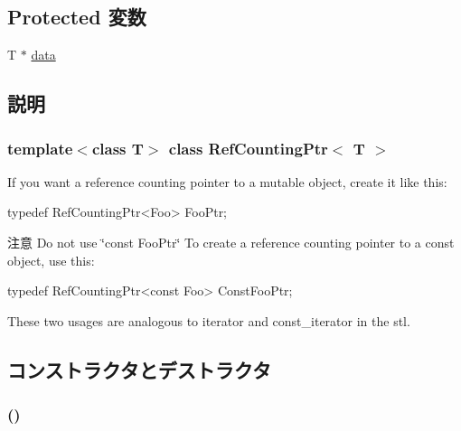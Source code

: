 \subsection*{Protected 変数}
\begin{DoxyCompactItemize}
\item 
T $\ast$ \hyperlink{classRefCountingPtr_ac88dceffbecaed1137b0e27783adbcc5}{data}
\end{DoxyCompactItemize}


\subsection{説明}
\subsubsection*{template$<$class T$>$ class RefCountingPtr$<$ T $>$}

If you want a reference counting pointer to a mutable object, create it like this: 
\begin{DoxyCode}
 typedef RefCountingPtr<Foo> FooPtr;
\end{DoxyCode}


\begin{DoxyAttention}{注意}
Do not use \char`\"{}const FooPtr\char`\"{} To create a reference counting pointer to a const object, use this: 
\begin{DoxyCode}
 typedef RefCountingPtr<const Foo> ConstFooPtr;
\end{DoxyCode}

\end{DoxyAttention}
These two usages are analogous to iterator and const\_\-iterator in the stl. 

\subsection{コンストラクタとデストラクタ}
\hypertarget{classRefCountingPtr_a36626d973a3bfce9ea3deda94b2fafe0}{
\subsubsection[{RefCountingPtr}]{ ()}}
\label{classRefCountingPtr_a36626d973a3bfce9ea3deda94b2fafe0}



